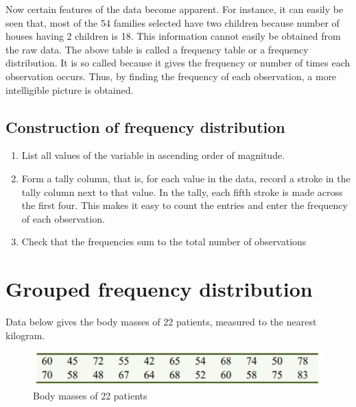 \documentclass[
]{book}
\begin{document}
Now certain features of the data become apparent. For instance, it can
easily be seen that, most of the 54 families selected have two children
because number of houses having 2 children is 18. This information
cannot easily be obtained from the raw data. The above table is called a
frequency table or a frequency distribution. It is so called because it
gives the frequency or number of times each observation occurs. Thus, by
finding the frequency of each observation, a more intelligible picture
is obtained.

\hypertarget{construction-of-frequency-distribution}{%
\subsection{Construction of frequency distribution}\label{construction-of-frequency-distribution}}

\begin{enumerate}
\def\labelenumi{\arabic{enumi}.}
\item
  List all values of the variable in ascending order of magnitude.
\item
  Form a tally column, that is, for each value in the data, record a
  stroke in the tally column next to that value. In the tally, each
  fifth stroke is made across the first four. This makes it easy to
  count the entries and enter the frequency of each observation.
\item
  Check that the frequencies sum to the total number of observations
\end{enumerate}

\hypertarget{grouped-frequency-distribution}{%
\section{Grouped frequency distribution}\label{grouped-frequency-distribution}}

Data below gives the body masses of 22 patients, measured to the nearest
kilogram.

\begin{figure}

{\centering \includegraphics[width=0.9\linewidth]{images/image5} 

}

\caption{Body masses of 22 patients}\label{fig:mass}
\end{figure}
\end{document}

